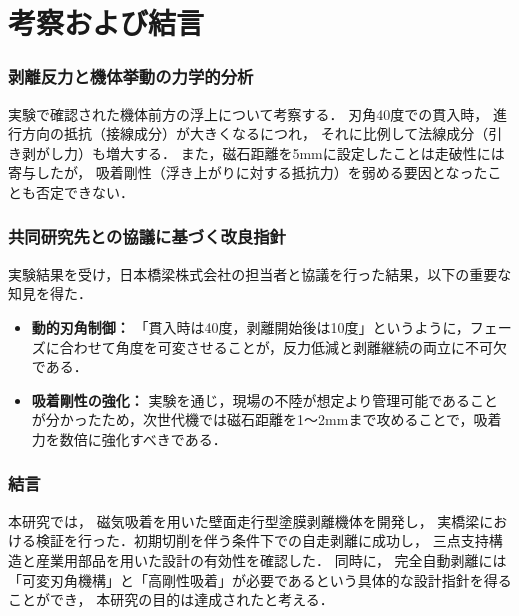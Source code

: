 \part{考察および結言}
\label{discussion}

\section{剥離反力と機体挙動の力学的分析}
実験で確認された機体前方の浮上について考察する．
刃角40度での貫入時，
進行方向の抵抗（接線成分）が大きくなるにつれ，
それに比例して法線成分（引き剥がし力）も増大する．
また，磁石距離を5mmに設定したことは走破性には寄与したが，
吸着剛性（浮き上がりに対する抵抗力）を弱める要因となったことも否定できない．

\newpage

\section{共同研究先との協議に基づく改良指針}
実験結果を受け，日本橋梁株式会社の担当者と協議を行った結果，以下の重要な知見を得た．
\begin{itemize}
    \item \textbf{動的刃角制御：} 「貫入時は40度，剥離開始後は10度」というように，フェーズに合わせて角度を可変させることが，反力低減と剥離継続の両立に不可欠である．
    \item \textbf{吸着剛性の強化：} 実験を通じ，現場の不陸が想定より管理可能であることが分かったため，次世代機では磁石距離を1～2mmまで攻めることで，吸着力を数倍に強化すべきである．
\end{itemize}

\newpage

\section{結言}
本研究では，
磁気吸着を用いた壁面走行型塗膜剥離機体を開発し，
実橋梁における検証を行った．初期切削を伴う条件下での自走剥離に成功し，
三点支持構造と産業用部品を用いた設計の有効性を確認した．
同時に，
完全自動剥離には「可変刃角機構」と「高剛性吸着」が必要であるという具体的な設計指針を得ることができ，
本研究の目的は達成されたと考える．

\newpage

